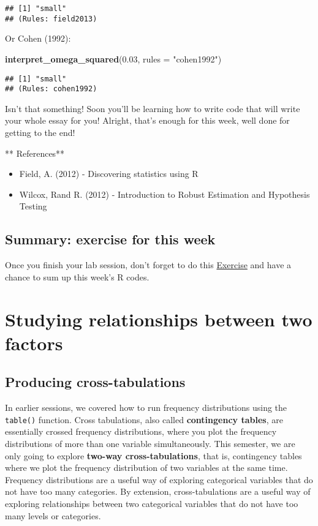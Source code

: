 \documentclass[
]{book}
\newenvironment{Shaded}{\begin{snugshade}}{\end{snugshade}}
\newcommand{\AttributeTok}[1]{\textcolor[rgb]{0.13,0.29,0.53}{#1}}
\newcommand{\FloatTok}[1]{\textcolor[rgb]{0.00,0.00,0.81}{#1}}
\newcommand{\FunctionTok}[1]{\textcolor[rgb]{0.13,0.29,0.53}{\textbf{#1}}}
\newcommand{\NormalTok}[1]{#1}
\newcommand{\StringTok}[1]{\textcolor[rgb]{0.31,0.60,0.02}{#1}}
\providecommand{\tightlist}{%
  \setlength{\itemsep}{0pt}\setlength{\parskip}{0pt}}
\begin{document}
\begin{verbatim}
## [1] "small"
## (Rules: field2013)
\end{verbatim}

Or Cohen (1992):

\begin{Shaded}
\begin{Highlighting}[]
\FunctionTok{interpret\_omega\_squared}\NormalTok{(}\FloatTok{0.03}\NormalTok{, }\AttributeTok{rules =} \StringTok{"cohen1992"}\NormalTok{)}
\end{Highlighting}
\end{Shaded}

\begin{verbatim}
## [1] "small"
## (Rules: cohen1992)
\end{verbatim}

Isn't that something! Soon you'll be learning how to write code that will write your whole essay for you! Alright, that's enough for this week, well done for getting to the end!

** References**

\begin{itemize}
\tightlist
\item
  Field, A. (2012) - Discovering statistics using R
\item
  Wilcox, Rand R. (2012) - Introduction to Robust Estimation and Hypothesis Testing
\end{itemize}

\section{Summary: exercise for this week}\label{summary-exercise-for-this-week-5}

Once you finish your lab session, don't forget to do this \href{https://eonk.shinyapps.io/MCD_ex}{Exercise} and have a chance to sum up this week's R codes.

\chapter{Studying relationships between two factors}\label{studying-relationships-between-two-factors}

\section{Producing cross-tabulations}\label{producing-cross-tabulations}

In earlier sessions, we covered how to run frequency distributions using the \texttt{table()} function. Cross tabulations, also called \textbf{contingency tables}, are essentially crossed frequency distributions, where you plot the frequency distributions of more than one variable simultaneously. This semester, we are only going to explore \textbf{two-way cross-tabulations}, that is, contingency tables where we plot the frequency distribution of two variables at the same time. Frequency distributions are a useful way of exploring categorical variables that do not have too many categories. By extension, cross-tabulations are a useful way of exploring relationships between two categorical variables that do not have too many levels or categories.
\end{document}
